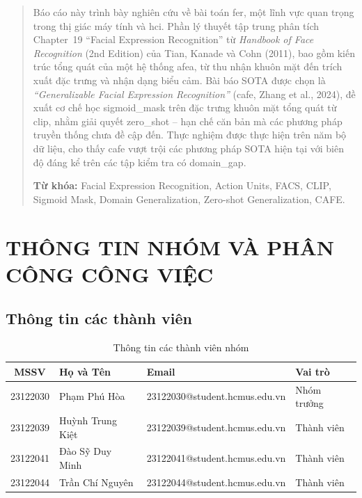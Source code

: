 \documentclass[12pt,a4paper]{article}
\let\oldtextbf\textbf
\renewcommand{\textbf}[1]{\oldtextbf{\textcolor{hcmublue}{#1}}}
\begin{document}
\begin{abstract}
Báo cáo này trình bày nghiên cứu về bài toán \gls{fer}, một lĩnh vực quan trọng trong thị giác máy tính và \gls{hci}. Phần lý thuyết tập trung phân tích Chapter~19 ``Facial Expression Recognition'' từ \textit{Handbook of Face Recognition} (2nd Edition) của Tian, Kanade và Cohn (2011), bao gồm kiến trúc tổng quát của một hệ thống \gls{afea}, từ thu nhận khuôn mặt đến trích xuất đặc trưng và nhận dạng biểu cảm. Bài báo SOTA được chọn là \textit{``Generalizable Facial Expression Recognition''} (\gls{cafe}, Zhang et al., 2024), đề xuất cơ chế học \gls{sigmoid_mask} trên đặc trưng khuôn mặt tổng quát từ \gls{clip}, nhằm giải quyết \gls{zero_shot} -- hạn chế căn bản mà các phương pháp truyền thống chưa đề cập đến. Thực nghiệm được thực hiện trên năm bộ dữ liệu, cho thấy \gls{cafe} vượt trội các phương pháp SOTA hiện tại với biên độ đáng kể trên các tập kiểm tra có \gls{domain_gap}.

\textbf{Từ khóa:} Facial Expression Recognition, Action Units, FACS, CLIP, Sigmoid Mask, Domain Generalization, Zero-shot Generalization, CAFE.
\end{abstract}

\newpage
\tableofcontents
\newpage
\listoftables
\listoffigures
\newpage
\printglossary[title={Danh sách Thuật ngữ}, toctitle={Danh sách Thuật ngữ}]
\newpage

\section{THÔNG TIN NHÓM VÀ PHÂN CÔNG CÔNG VIỆC}

\subsection{Thông tin các thành viên}

\begin{table}[H]
\centering
\begin{tabular}{|c|l|l|l|}
\hline
\textbf{MSSV} & \textbf{Họ và Tên} & \textbf{Email} & \textbf{Vai trò} \\ \hline
23122030 & Phạm Phú Hòa    & 23122030@student.hcmus.edu.vn & Nhóm trưởng \\ \hline
23122039 & Huỳnh Trung Kiệt & 23122039@student.hcmus.edu.vn & Thành viên \\ \hline
23122041 & Đào Sỹ Duy Minh  & 23122041@student.hcmus.edu.vn & Thành viên \\ \hline
23122044 & Trần Chí Nguyên  & 23122044@student.hcmus.edu.vn & Thành viên \\ \hline
\end{tabular}
\caption{Thông tin các thành viên nhóm}
\label{tab:team_info}
\end{table}
\end{document}
